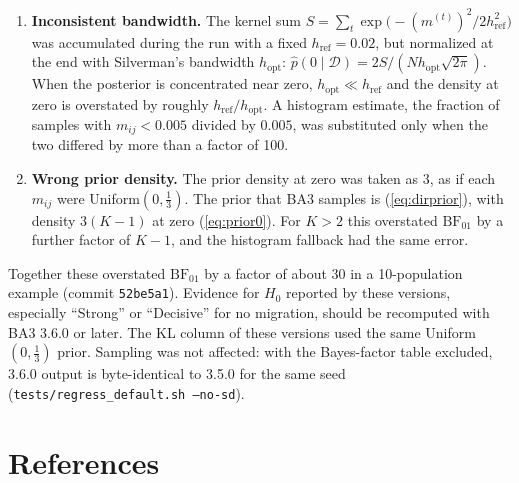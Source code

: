 \documentclass[11pt,a4paper]{article}
\newcommand{\BF}{\mathrm{BF}}
\newcommand{\data}{\mathcal{D}}
\newcommand{\1}{\mathbf{1}}
\begin{document}
\begin{enumerate}
\item \textbf{Inconsistent bandwidth.} The kernel sum
$S=\sum_t \exp\!\big(-(m^{(t)})^2/2h_{\text{ref}}^2\big)$ was accumulated during
the run with a fixed $h_{\text{ref}}=0.02$, but normalized at the end with
Silverman's bandwidth $h_{\text{opt}}$:
$\hat p(0\mid\data)=2S/(N h_{\text{opt}}\sqrt{2\pi})$. When the posterior is
concentrated near zero, $h_{\text{opt}}\ll h_{\text{ref}}$ and the density at
zero is overstated by roughly $h_{\text{ref}}/h_{\text{opt}}$. A histogram
estimate, the fraction of samples with $m_{ij}<0.005$ divided by $0.005$, was
substituted only when the two differed by more than a factor of 100.

\item \textbf{Wrong prior density.} The prior density at zero was taken as $3$,
as if each $m_{ij}$ were Uniform$(0,\frac13)$. The prior that BA3 samples is
(\ref{eq:dirprior}), with density $3(K-1)$ at zero (\ref{eq:prior0}). For $K>2$
this overstated $\BF_{01}$ by a further factor of $K-1$, and the histogram
fallback had the same error.
\end{enumerate}

Together these overstated $\BF_{01}$ by a factor of about 30 in a
10-population example (commit \texttt{52be5a1}).
Evidence for $H_0$ reported by these versions, especially ``Strong'' or
``Decisive'' for no migration, should be recomputed with BA3 3.6.0 or later.
The KL column of these versions used the same Uniform$(0,\frac13)$ prior.
Sampling was not affected: with the Bayes-factor table excluded, 3.6.0 output
is byte-identical to 3.5.0 for the same seed (\texttt{tests/regress\_default.sh
--no-sd}).

\section*{References}
\end{document}
